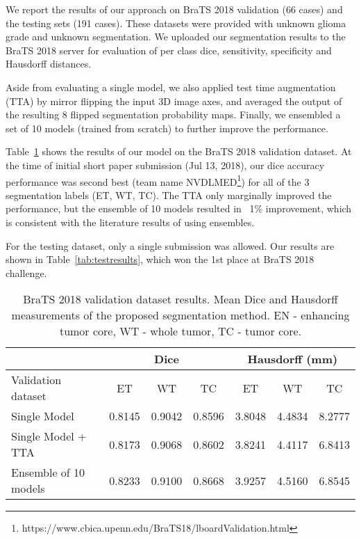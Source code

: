 \documentclass[runningheads]{llncs}
\newcommand{\0}{\ensuremath{\mathbf{0}}}
\newcommand{\1}{\ensuremath{\mathbf{1}}}
\begin{document}
 We report the results of our approach  on BraTS 2018 validation (66 cases) and the testing sets (191 cases). These datasets were provided with unknown glioma grade and unknown segmentation. We uploaded our segmentation results to the BraTS 2018 server for evaluation of per class dice, sensitivity, specificity and Hausdorff distances. 
 
  Aside from evaluating a single model,  we also applied test time augmentation (TTA) by mirror flipping the input 3D image axes, and averaged the output of the resulting 8 flipped segmentation probability maps. Finally, we ensembled a set of 10 models (trained from scratch) to further improve the performance.

 
 Table~\ref{tab:valid} shows the results of our model on the BraTS 2018 validation dataset. At the time of initial short paper submission (Jul 13, 2018), our dice accuracy performance was second best (team name  NVDLMED\footnote{https://www.cbica.upenn.edu/BraTS18/lboardValidation.html}) for all of the 3 segmentation labels  (ET, WT, TC). 
 The TTA only marginally improved the performance, but the ensemble of 10 models resulted in ~1\% improvement, which is consistent with the literature results of using ensembles. 
 
 For the testing dataset, only a single submission was allowed. Our results are shown in  Table~\ref{tab:testresults}, which won the 1st place at BraTS 2018 challenge. 

 
\begin{table}
	\centering
\caption{BraTS 2018 validation dataset results. Mean Dice and Hausdorff measurements of the proposed segmentation method. EN - enhancing tumor core, WT - whole tumor, TC - tumor core.}
	\label{tab:valid}
	\begin{tabular}{l|c|c|c|c|c|c}
		\hline
		& \multicolumn{3}{c|}{Dice} & \multicolumn{3}{c}{Hausdorff (mm)}  \\ \hline
		Validation dataset & ET & WT & TC & ET & WT & TC \\ \hline
		Single Model & 0.8145 & 0.9042 & 0.8596 & 3.8048 & 4.4834 & 8.2777 \\
		Single Model + TTA & 0.8173 & 0.9068 & 0.8602 & 3.8241 & 4.4117 & 6.8413 \\
		Ensemble of 10 models  & 0.8233 & 0.9100 & 0.8668 & 3.9257 & 4.5160 & 6.8545 \\
		\hline
	\end{tabular}
\end{table}
 
\end{document}
